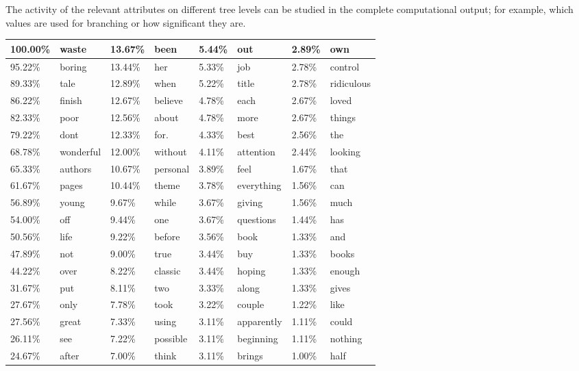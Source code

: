 \documentclass[10pt]{book}
\begin{document}
The activity of the relevant attributes on different tree levels can be studied in the complete computational output; for example, which values are used for branching or how significant they are.

\begin{table}[h]
\begin{center}
\begin{tabular}{|l|l|l|l|l|l|l|l|}
\hline
100.00\% & waste & 13.67\% & been & 5.44\% & out & 2.89\% & own \\
\hline
95.22\% & boring & 13.44\% & her & 5.33\% & job & 2.78\% & control \\
\hline
89.33\% & tale & 12.89\% & when & 5.22\% & title & 2.78\% & ridiculous \\
\hline
86.22\% & finish & 12.67\% & believe & 4.78\% & each & 2.67\% & loved \\
\hline
82.33\% & poor & 12.56\% & about & 4.78\% & more & 2.67\% & things \\
\hline
79.22\% & dont & 12.33\% & for. & 4.33\% & best & 2.56\% & the \\
\hline
68.78\% & wonderful & 12.00\% & without & 4.11\% & attention & 2.44\% & looking \\
\hline
65.33\% & authors & 10.67\% & personal & 3.89\% & feel & 1.67\% & that \\
\hline
61.67\% & pages & 10.44\% & theme & 3.78\% & everything & 1.56\% & can \\
\hline
56.89\% & young & 9.67\% & while & 3.67\% & giving & 1.56\% & much \\
\hline
54.00\% & off & 9.44\% & one & 3.67\% & questions & 1.44\% & has \\
\hline
50.56\% & life & 9.22\% & before & 3.56\% & book & 1.33\% & and \\
\hline
47.89\% & not & 9.00\% & true & 3.44\% & buy & 1.33\% & books \\
\hline
44.22\% & over & 8.22\% & classic & 3.44\% & hoping & 1.33\% & enough \\
\hline
31.67\% & put & 8.11\% & two & 3.33\% & along & 1.33\% & gives \\
\hline
27.67\% & only & 7.78\% & took & 3.22\% & couple & 1.22\% & like \\
\hline
27.56\% & great & 7.33\% & using & 3.11\% & apparently & 1.11\% & could \\
\hline
26.11\% & see & 7.22\% & possible & 3.11\% & beginning & 1.11\% & nothing \\
\hline
24.67\% & after & 7.00\% & think & 3.11\% & brings & 1.00\% & half \\

\end{tabular}
\end{center}
\end{table}
\end{document}
